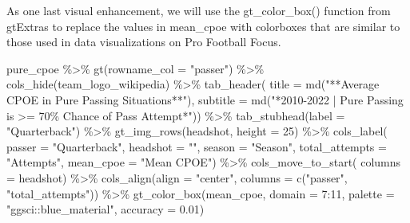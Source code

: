 \documentclass[
  letterpaper,
]{krantz}
\newenvironment{Shaded}{\begin{snugshade}}{\end{snugshade}}
\newcommand{\AttributeTok}[1]{\textcolor[rgb]{0.40,0.45,0.13}{#1}}
\newcommand{\DecValTok}[1]{\textcolor[rgb]{0.68,0.00,0.00}{#1}}
\newcommand{\FloatTok}[1]{\textcolor[rgb]{0.68,0.00,0.00}{#1}}
\newcommand{\FunctionTok}[1]{\textcolor[rgb]{0.28,0.35,0.67}{#1}}
\newcommand{\NormalTok}[1]{\textcolor[rgb]{0.00,0.23,0.31}{#1}}
\newcommand{\SpecialCharTok}[1]{\textcolor[rgb]{0.37,0.37,0.37}{#1}}
\newcommand{\StringTok}[1]{\textcolor[rgb]{0.13,0.47,0.30}{#1}}
\begin{document}
As one last visual enhancement, we will use the gt\_color\_box()
function from gtExtras to replace the values in mean\_cpoe with
colorboxes that are similar to those used in data visualizations on Pro
Football Focus.

\begin{Shaded}
\begin{Highlighting}[]
\NormalTok{pure\_cpoe }\SpecialCharTok{\%\textgreater{}\%}
  \FunctionTok{gt}\NormalTok{(}\AttributeTok{rowname\_col =} \StringTok{"passer"}\NormalTok{) }\SpecialCharTok{\%\textgreater{}\%}
  \FunctionTok{cols\_hide}\NormalTok{(team\_logo\_wikipedia) }\SpecialCharTok{\%\textgreater{}\%}
  \FunctionTok{tab\_header}\NormalTok{(}
    \AttributeTok{title =} \FunctionTok{md}\NormalTok{(}\StringTok{"**Average CPOE in Pure Passing Situations**"}\NormalTok{),}
    \AttributeTok{subtitle =} \FunctionTok{md}\NormalTok{(}\StringTok{"*2010{-}2022  |  Pure Passing is \textgreater{}= 70\% Chance of Pass Attempt*"}\NormalTok{)) }\SpecialCharTok{\%\textgreater{}\%}
  \FunctionTok{tab\_stubhead}\NormalTok{(}\AttributeTok{label =} \StringTok{"Quarterback"}\NormalTok{) }\SpecialCharTok{\%\textgreater{}\%}
  \FunctionTok{gt\_img\_rows}\NormalTok{(headshot, }\AttributeTok{height =} \DecValTok{25}\NormalTok{) }\SpecialCharTok{\%\textgreater{}\%}
  \FunctionTok{cols\_label}\NormalTok{(}
    \AttributeTok{passer =} \StringTok{"Quarterback"}\NormalTok{,}
    \AttributeTok{headshot =} \StringTok{""}\NormalTok{,}
    \AttributeTok{season =} \StringTok{"Season"}\NormalTok{,}
    \AttributeTok{total\_attempts =} \StringTok{"Attempts"}\NormalTok{,}
    \AttributeTok{mean\_cpoe =} \StringTok{"Mean CPOE"}\NormalTok{) }\SpecialCharTok{\%\textgreater{}\%}
  \FunctionTok{cols\_move\_to\_start}\NormalTok{(}
    \AttributeTok{columns =}\NormalTok{ headshot) }\SpecialCharTok{\%\textgreater{}\%}
  \FunctionTok{cols\_align}\NormalTok{(}\AttributeTok{align =} \StringTok{"center"}\NormalTok{, }\AttributeTok{columns =} \FunctionTok{c}\NormalTok{(}\StringTok{"passer"}\NormalTok{, }\StringTok{"total\_attempts"}\NormalTok{)) }\SpecialCharTok{\%\textgreater{}\%}
  \FunctionTok{gt\_color\_box}\NormalTok{(mean\_cpoe, }\AttributeTok{domain =} \DecValTok{7}\SpecialCharTok{:}\DecValTok{11}\NormalTok{,}
               \AttributeTok{palette =} \StringTok{"ggsci::blue\_material"}\NormalTok{, }\AttributeTok{accuracy =} \FloatTok{0.01}\NormalTok{)}
\end{Highlighting}
\end{Shaded}
\end{document}
